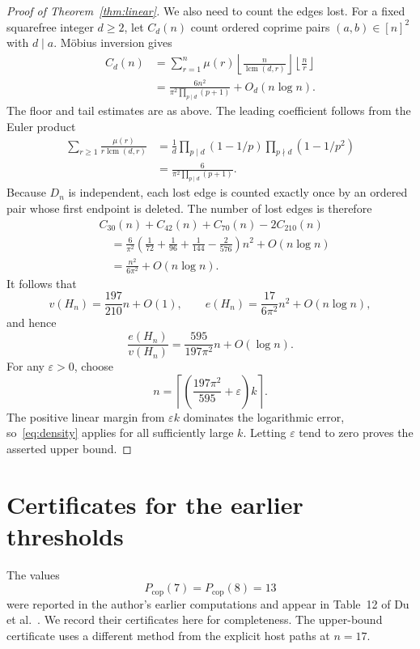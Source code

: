 \documentclass[12pt]{article}
\newcommand{\Pcop}{P_{\mathrm{cop}}}
\begin{document}
\begin{proof}[Proof of Theorem~\ref{thm:linear}]
We also need to count the edges lost. For a fixed squarefree
integer $d\geq2$, let $C_d(n)$ count ordered coprime pairs
$(a,b)\in[n]^2$ with $d\mid a$. M\"obius inversion gives
\begin{align*}
 C_d(n)
 &=\sum_{r=1}^n\mu(r)
   \left\lfloor\frac n{\operatorname{lcm}(d,r)}\right\rfloor
   \left\lfloor\frac nr\right\rfloor\\
 &=\frac{6n^2}{\pi^2\prod_{p\mid d}(p+1)}
   +O_d(n\log n).
\end{align*}
The floor and tail estimates are as above. The leading
coefficient follows from the Euler product
\[
 \begin{split}
 \sum_{r\geq1}\frac{\mu(r)}{r\operatorname{lcm}(d,r)}
 &=\frac1d\prod_{p\mid d}(1-1/p)
             \prod_{p\nmid d}(1-1/p^2)\\
 &=\frac6{\pi^2\prod_{p\mid d}(p+1)}.
 \end{split}
\]
Because $D_n$ is independent, each lost edge is counted
exactly once by an ordered pair whose first endpoint is
deleted. The number of lost edges is therefore
\begin{align*}
 &C_{30}(n)+C_{42}(n)+C_{70}(n)-2C_{210}(n)\\
 &\quad=\frac6{\pi^2}
  \left(\frac1{72}+\frac1{96}+\frac1{144}-\frac2{576}\right)n^2
  +O(n\log n)\\
 &\quad=\frac{n^2}{6\pi^2}+O(n\log n).
\end{align*}
It follows that
\[
 v(H_n)=\frac{197}{210}n+O(1),\qquad
 e(H_n)=\frac{17}{6\pi^2}n^2+O(n\log n),
\]
and hence
\[
 \frac{e(H_n)}{v(H_n)}
 =\frac{595}{197\pi^2}n+O(\log n).
\]
For any $\varepsilon>0$, choose
\[
 n=\left\lceil\left(\frac{197\pi^2}{595}+\varepsilon\right)k
       \right\rceil.
\]
The positive linear margin from $\varepsilon k$ dominates
the logarithmic error, so~\eqref{eq:density} applies for
all sufficiently large $k$. Letting $\varepsilon$ tend to
zero proves the asserted upper bound.
\end{proof}

\section{Certificates for the earlier thresholds}\label{sec:earlier}

The values
\[
 \Pcop(7)=\Pcop(8)=13
\]
were reported in the author's earlier computations and appear
in Table~12 of Du et al.~\cite{du}. We record their certificates
here for completeness. The upper-bound certificate uses a
different method from the explicit host paths at $n=17$.
\end{document}
